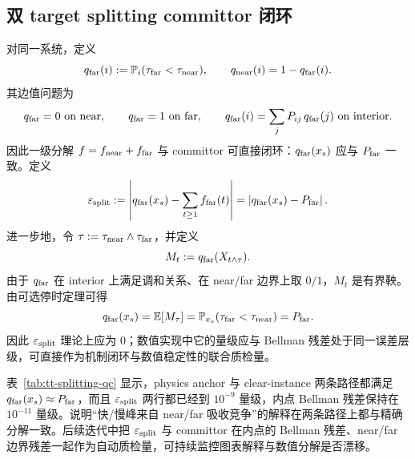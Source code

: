 \documentclass[11pt,fontset=fandol]{ctexart}
\begin{document}
\subsection*{双 target splitting committor 闭环}
对同一系统，定义
\[
q_{\rm far}(i):=\mathbb P_i(\tau_{\rm far}<\tau_{\rm near}),\qquad q_{\rm near}(i)=1-q_{\rm far}(i).
\]
其边值问题为
\[
q_{\rm far}=0\ \text{on near},\qquad q_{\rm far}=1\ \text{on far},\qquad
q_{\rm far}(i)=\sum_j P_{ij}\,q_{\rm far}(j)\ \text{on interior}.
\]
因此一级分解 $f=f_{\rm near}+f_{\rm far}$ 与 committor 可直接闭环：$q_{\rm far}(x_s)$ 应与 $P_{\rm far}$ 一致。定义
\[
\varepsilon_{\rm split}:=\left|q_{\rm far}(x_s)-\sum_{t\ge 1}f_{\rm far}(t)\right|
=\left|q_{\rm far}(x_s)-P_{\rm far}\right|.
\]
进一步地，令 $\tau:=\tau_{\rm near}\wedge\tau_{\rm far}$，并定义
\[
M_t:=q_{\rm far}(X_{t\wedge\tau}).
\]
由于 $q_{\rm far}$ 在 interior 上满足调和关系、在 near/far 边界上取 $0/1$，$M_t$ 是有界鞅。由可选停时定理可得
\[
q_{\rm far}(x_s)=\mathbb E[M_\tau]
=\mathbb P_{x_s}(\tau_{\rm far}<\tau_{\rm near})
=P_{\rm far}.
\]
因此 $\varepsilon_{\rm split}$ 理论上应为 $0$；数值实现中它的量级应与 Bellman 残差处于同一误差层级，可直接作为机制闭环与数值稳定性的联合质检量。
\begin{table}[!htbp]
  \centering
  \footnotesize
  \resizebox{\linewidth}{!}{}
  \caption{no-corridor 双 target 的 splitting committor 闭环质检（physics anchor，在旧表格里仍记为 representative，另加专用 clear-instance）：同时报告 $q_{\rm far}(x_s)$、$P_{\rm far}$、$\varepsilon_{\rm split}$ 与内点/边界残差。}
  \label{tab:tt-splitting-qc}
\end{table}

表~\ref{tab:tt-splitting-qc} 显示，physics anchor 与 clear-instance 两条路径都满足 $q_{\rm far}(x_s)\approx P_{\rm far}$，而且 $\varepsilon_{\rm split}$ 两行都已经到 $10^{-9}$ 量级，内点 Bellman 残差保持在 $10^{-11}$ 量级。说明“快/慢峰来自 near/far 吸收竞争”的解释在两条路径上都与精确分解一致。后续迭代中把 $\varepsilon_{\rm split}$ 与 committor 在内点的 Bellman 残差、near/far 边界残差一起作为自动质检量，可持续监控图表解释与数值分解是否漂移。
\end{document}
